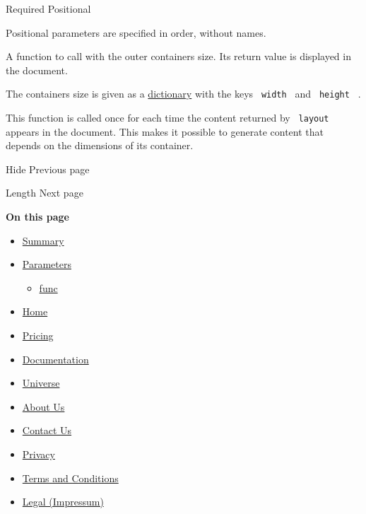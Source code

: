 {Required} {{ Positional }}

\label{parameters-func-positional-tooltip}
Positional parameters are specified in order, without names.

A function to call with the outer container\textquotesingle s size. Its
return value is displayed in the document.

The container\textquotesingle s size is given as a
\href{/docs/reference/foundations/dictionary/}{dictionary} with the keys
\texttt{\ width\ } and \texttt{\ height\ } .

This function is called once for each time the content returned by
\texttt{\ layout\ } appears in the document. This makes it possible to
generate content that depends on the dimensions of its container.

\href{/docs/reference/layout/hide/}{\pandocbounded{}}

{ Hide } { Previous page }

\href{/docs/reference/layout/length/}{\pandocbounded{}}

{ Length } { Next page }

\textbf{On this page}

\begin{itemize}
\tightlist
\item
  \hyperref[summary]{Summary}
\item
  \hyperref[parameters]{Parameters}

  \begin{itemize}
  \tightlist
  \item
    \hyperref[parameters-func]{func}
  \end{itemize}
\end{itemize}

\begin{itemize}
\tightlist
\item
  \href{/}{Home}
\item
  \href{/pricing/}{Pricing}
\item
  \href{/docs/}{Documentation}
\item
  \href{/universe/}{Universe}
\item
  \href{/about/}{About Us}
\item
  \href{/contact/}{Contact Us}
\item
  \href{/privacy/}{Privacy}
\item
  \href{https://typst.app/terms}{Terms and Conditions}
\item
  \href{/legal/}{Legal (Impressum)}
\end{itemize}

